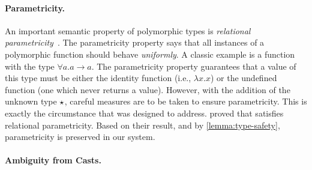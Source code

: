 \paragraph{Parametricity.} An important semantic property of polymorphic types is
\textit{relational parametricity}~\citep{reynolds1983types}. The parametricity
property says that all instances of a polymorphic function should
behave \textit{uniformly}. %
A classic example is a function with the type $\forall a . a \to a$. The
parametricity property guarantees that a value of this type must be either the
identity function (i.e., $\lambda x . x$) or the undefined function (one which
never returns a value). However, with the addition of the unknown type
$\star$, careful measures are to be taken to ensure parametricity. This is
exactly the circumstance that \pbc was designed to address. \citet{amal2017blame}
proved that \pbc satisfies relational parametricity. Based on their result, and
by \cref{lemma:type-safety}, parametricity is preserved in our system.

\paragraph{Ambiguity from Casts.}

